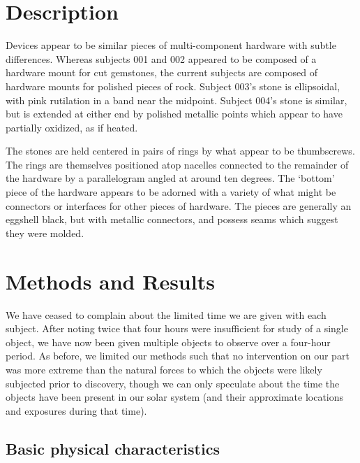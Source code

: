 \documentclass[10pt]{article}
\begin{document}
\maketitle


\section{Description}

Devices appear to be similar pieces of multi-component hardware with subtle differences.
Whereas subjects 001 and 002 appeared to be composed of a hardware mount for cut gemstones, the current subjects are composed of hardware mounts for polished pieces of rock.
Subject 003's stone is ellipsoidal, with pink rutilation in a band near the midpoint.
Subject 004's stone is similar, but is extended at either end by polished metallic points which appear to have partially oxidized, as if heated.

The stones are held centered in pairs of rings by what appear to be thumbscrews.
The rings are themselves positioned atop nacelles connected to the remainder of the hardware by a parallelogram angled at around ten degrees.
The `bottom' piece of the hardware appears to be adorned with a variety of what might be connectors or interfaces for other pieces of hardware.
The pieces are generally an eggshell black, but with metallic connectors, and possess seams which suggest they were molded.

\section{Methods and Results}
We have ceased to complain about the limited time we are given with each subject.
After noting twice that four hours were insufficient for study of a single object, we have now been given multiple objects to observe over a four-hour period.
As before, we limited our methods such that no intervention on our part was more extreme than the natural forces to which the objects were likely subjected prior to discovery, though we can only speculate about the time the objects have been present in our solar system (and their approximate locations and exposures during that time).

\subsection{Basic physical characteristics}
\end{document}
